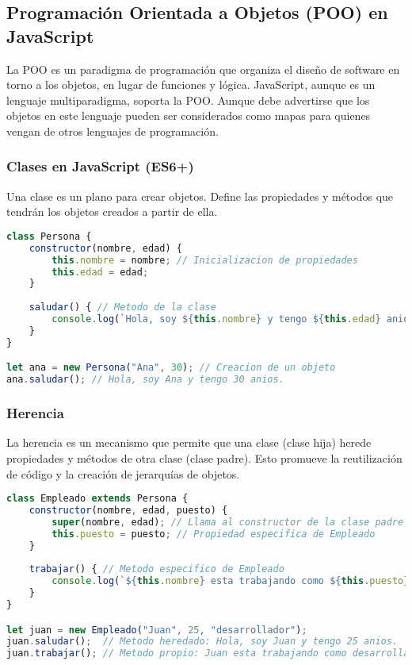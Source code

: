 \documentclass{book}
\begin{document}
\subsection{Programación Orientada a Objetos (POO) en JavaScript}

La POO es un paradigma de programación que organiza el diseño de software en torno a los objetos, en lugar de funciones y lógica. JavaScript, aunque es un lenguaje multiparadigma, soporta la POO. Aunque debe advertirse que los objetos en este lenguaje pueden ser considerados como mapas para quienes vengan de otros lenguajes de programación.

\subsubsection{Clases en JavaScript (ES6+)}

Una clase es un plano para crear objetos. Define las propiedades y métodos que tendrán los objetos creados a partir de ella.

\begin{lstlisting}[language=JavaScript]
class Persona {
    constructor(nombre, edad) {
        this.nombre = nombre; // Inicializacion de propiedades
        this.edad = edad;
    }
    
    saludar() { // Metodo de la clase
        console.log(`Hola, soy ${this.nombre} y tengo ${this.edad} anios.`);
    }
}

let ana = new Persona("Ana", 30); // Creacion de un objeto
ana.saludar(); // Hola, soy Ana y tengo 30 anios.
\end{lstlisting}

\subsubsection{Herencia}

La herencia es un mecanismo que permite que una clase (clase hija) herede propiedades y métodos de otra clase (clase padre). Esto promueve la reutilización de código y la creación de jerarquías de objetos.

\begin{lstlisting}[language=JavaScript]
class Empleado extends Persona {
    constructor(nombre, edad, puesto) {
        super(nombre, edad); // Llama al constructor de la clase padre
        this.puesto = puesto; // Propiedad especifica de Empleado
    }
    
    trabajar() { // Metodo especifico de Empleado
        console.log(`${this.nombre} esta trabajando como ${this.puesto}.`);
    }
}

let juan = new Empleado("Juan", 25, "desarrollador");
juan.saludar();  // Metodo heredado: Hola, soy Juan y tengo 25 anios.
juan.trabajar(); // Metodo propio: Juan esta trabajando como desarrollador.
\end{lstlisting}
\end{document}

